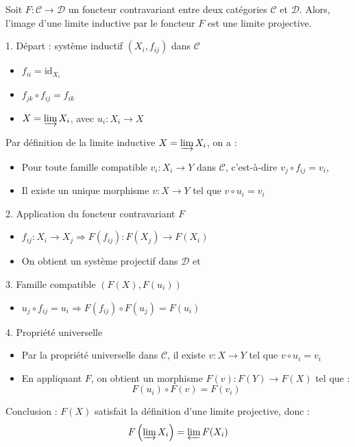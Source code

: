 \documentclass[9pt]{beamer}
\begin{document}
\begin{frame}
 \begin{theorem}
Soit \( F: \mathcal{C} \to \mathcal{D} \) un foncteur contravariant entre deux catégories \( \mathcal{C} \) et \( \mathcal{D} \). Alors, l'image d'une limite inductive par le foncteur $F$ est une limite projective.
 \end{theorem}

	1. Départ : système inductif \((X_i, f_{ij})\) dans \( \mathcal{C} \)
\begin{itemize}
	\item \( f_{ii} = \text{id}_{X_i} \)
	\item \( f_{jk} \circ f_{ij} = f_{ik} \)
	\item \( X = \varinjlim X_i \), avec \( u_i: X_i \to X \)
\end{itemize}
Par définition de la limite inductive \( X = \varinjlim X_i \), on a :
\begin{itemize}
	\item Pour toute famille compatible \( v_i: X_i \to Y \) dans \( \mathcal{C} \), c’est-à-dire \( v_j \circ f_{ij} = v_i \),
	\item Il existe un unique morphisme \( v: X \to Y \) tel que \( v \circ u_i = v_i \)
\end{itemize}

2. Application du foncteur contravariant \( F \)
\begin{itemize}
	\item \( f_{ij}: X_i \to X_j \Rightarrow F(f_{ij}): F(X_j) \to F(X_i) \)
	\item On obtient un système projectif dans \( \mathcal{D} \) et 
\end{itemize}

3. Famille compatible \((F(X), F(u_i))\)
\begin{itemize}
	\item \( u_j \circ f_{ij} = u_i \Rightarrow F(f_{ij}) \circ F(u_j) = F(u_i) \)
\end{itemize}

\end{frame}


\begin{frame}
	4. Propriété universelle
\begin{itemize}
	\item Par la propriété universelle dans \( \mathcal{C} \), il existe \( v: X \to Y \) tel que \( v \circ u_i = v_i \)
	\item En appliquant \( F \), on obtient un morphisme \( F(v): F(Y) \to F(X) \) tel que :
	\[
	F(u_i) \circ F(v) = F(v_i)
	\]
\end{itemize}

	Conclusion : \( F(X) \) satisfait la définition d'une limite projective, donc :
\[
F\left( \varinjlim X_i \right) = \varprojlim F(X_i)
\]



\end{frame}
\end{document}
